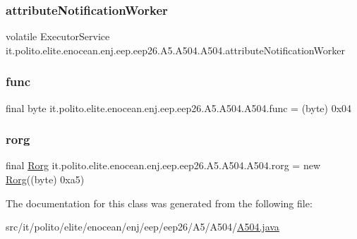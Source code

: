 \subsubsection{\texorpdfstring{attribute\+Notification\+Worker}{attributeNotificationWorker}}
{\footnotesize\ttfamily volatile Executor\+Service it.\+polito.\+elite.\+enocean.\+enj.\+eep.\+eep26.\+A5.\+A504.\+A504.\+attribute\+Notification\+Worker\hspace{0.3cm}{\ttfamily [protected]}}

\hypertarget{classit_1_1polito_1_1elite_1_1enocean_1_1enj_1_1eep_1_1eep26_1_1_a5_1_1_a504_1_1_a504_a7cb0e4912a6ceb26779be58fb653f043}{}\label{classit_1_1polito_1_1elite_1_1enocean_1_1enj_1_1eep_1_1eep26_1_1_a5_1_1_a504_1_1_a504_a7cb0e4912a6ceb26779be58fb653f043} 
\subsubsection{\texorpdfstring{func}{func}}
{\footnotesize\ttfamily final byte it.\+polito.\+elite.\+enocean.\+enj.\+eep.\+eep26.\+A5.\+A504.\+A504.\+func = (byte) 0x04\hspace{0.3cm}{\ttfamily [static]}}

\hypertarget{classit_1_1polito_1_1elite_1_1enocean_1_1enj_1_1eep_1_1eep26_1_1_a5_1_1_a504_1_1_a504_a4bd9f2a7aaf64037eec1625b5892ff1c}{}\label{classit_1_1polito_1_1elite_1_1enocean_1_1enj_1_1eep_1_1eep26_1_1_a5_1_1_a504_1_1_a504_a4bd9f2a7aaf64037eec1625b5892ff1c} 
\subsubsection{\texorpdfstring{rorg}{rorg}}
{\footnotesize\ttfamily final \hyperlink{classit_1_1polito_1_1elite_1_1enocean_1_1enj_1_1eep_1_1_rorg}{Rorg} it.\+polito.\+elite.\+enocean.\+enj.\+eep.\+eep26.\+A5.\+A504.\+A504.\+rorg = new \hyperlink{classit_1_1polito_1_1elite_1_1enocean_1_1enj_1_1eep_1_1_rorg}{Rorg}((byte) 0xa5)\hspace{0.3cm}{\ttfamily [static]}}



The documentation for this class was generated from the following file\+:\begin{DoxyCompactItemize}
\item 
src/it/polito/elite/enocean/enj/eep/eep26/\+A5/\+A504/\hyperlink{_a504_8java}{A504.\+java}\end{DoxyCompactItemize}
